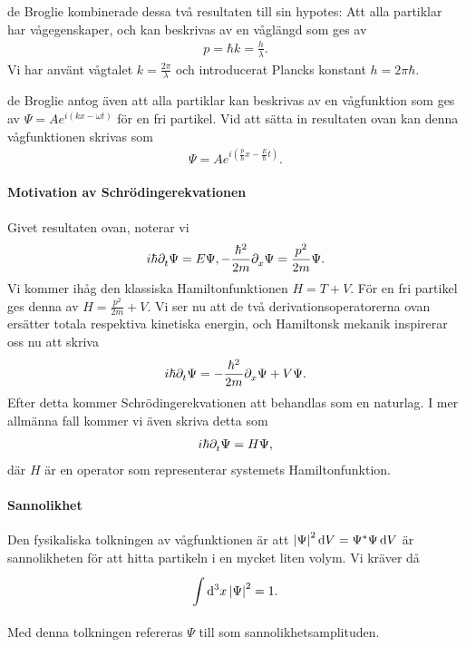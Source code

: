 de Broglie kombinerade dessa två resultaten till sin hypotes: Att alla partiklar har vågegenskaper, och kan beskrivas av en våglängd som ges av
\begin{align*}
	p = \hbar k = \frac{h}{\lambda}.
\end{align*}
Vi har använt vågtalet $k = \frac{2\pi}{\lambda}$ och introducerat Plancks konstant $h = 2\pi\hbar$.

de Broglie antog även att alla partiklar kan beskrivas av en vågfunktion som ges av $\Psi = Ae^{i(kx - \omega t)}$ för en fri partikel. Vid att sätta in resultaten ovan kan denna vågfunktionen skrivas som
\begin{align*}
	\Psi = Ae^{i(\frac{p}{\hbar}x - \frac{E}{\hbar}t)}.
\end{align*}

\paragraph{Motivation av Schrödingerekvationen}
Givet resultaten ovan, noterar vi
\begin{align*}
	i\hbar\partial_{t}^{}\Psi = E\Psi, -\frac{\hbar^{2}}{2m}\partial_{x}^{}\Psi = \frac{p^{2}}{2m}\Psi.
\end{align*}
Vi kommer ihåg den klassiska Hamiltonfunktionen $H = T + V$. För en fri partikel ges denna av $H = \frac{p^{2}}{2m} + V$. Vi ser nu att de två derivationsoperatorerna ovan ersätter totala respektiva kinetiska energin, och Hamiltonsk mekanik inspirerar oss nu att skriva
\begin{align*}
	i\hbar\partial_{t}^{}\Psi = -\frac{\hbar^{2}}{2m}\partial_{x}^{}\Psi + V\Psi.
\end{align*}
Efter detta kommer Schrödingerekvationen att behandlas som en naturlag. I mer allmänna fall kommer vi även skriva detta som
\begin{align*}
	i\hbar\partial_{t}^{}\Psi = H\Psi,
\end{align*}
där $H$ är en operator som representerar systemets Hamiltonfunktion.

\paragraph{Sannolikhet}
Den fysikaliska tolkningen av vågfunktionen är att $\abs{\Psi}^{2}\dd{V} = \Psi^{*}\Psi\dd{V}$ är sannolikheten för att hitta partikeln i en mycket liten volym. Vi kräver då
\begin{align*}
	\int\limits_{}^{}\dd[3]{x}\abs{\Psi}^{2} = 1.
\end{align*}
Med denna tolkningen refereras $\Psi$ till som sannolikhetsamplituden.

